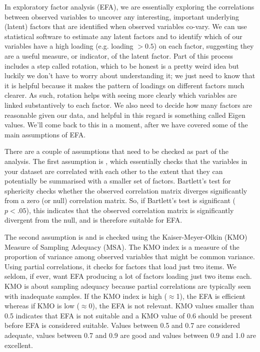 In exploratory factor analysis (EFA), we are essentially exploring the correlations between observed variables to uncover any interesting, important underlying (latent) factors that are identified when observed variables co-vary. We can use statistical software to estimate any latent factors and to identify which of our variables have a high loading (e.g. loading $>0.5$) on each factor, suggesting they are a useful measure, or indicator, of the latent factor. Part of this process includes a step called rotation, which to be honest is a pretty weird idea but luckily we don’t have to worry about understanding it; we just need to know that it is helpful because it makes the pattern of loadings on different factors much clearer. As such, rotation helps with seeing more clearly which variables are linked substantively to each factor. We also need to decide how many factors are reasonable given our data, and helpful in this regard is something called Eigen values. We'll come back to this in a moment, after we have covered some of the main assumptions of EFA.


There are a couple of assumptions that need to be checked as part of the analysis. The first assumption is , which essentially checks that the variables in your dataset are correlated with each other to the extent that they can potentially be summarised with a smaller set of factors. Bartlett’s test for sphericity checks whether the observed correlation matrix diverges significantly from a zero (or null) correlation matrix. So, if Bartlett’s test is significant ($p<.05$), this indicates that the observed correlation matrix is significantly divergent from the null, and is therefore suitable for EFA. 

The second assumption is  and is checked using the Kaiser-Meyer-Olkin (KMO) Measure of Sampling Adequacy (MSA). The KMO index is a measure of the proportion of variance among observed variables that might be common variance. Using partial correlations, it checks for factors that load just two items. We seldom, if ever, want EFA producing a lot of factors loading just two items each. KMO is about sampling adequacy because partial correlations are typically seen with inadequate samples.  If the KMO index is high ($\approx$1), the EFA is efficient whereas if KMO is low ($\approx$0), the EFA is not relevant. KMO values smaller than 0.5 indicates that EFA is not suitable and a KMO value of 0.6 should be present before EFA is considered suitable. Values between 0.5 and 0.7 are considered adequate, values between 0.7 and 0.9 are good and values between 0.9 and 1.0 are excellent.

